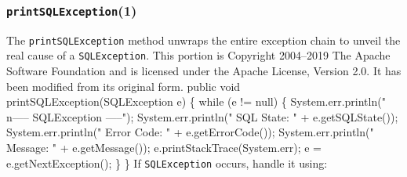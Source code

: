 \documentclass{article}
\def\nwendcode{\endtrivlist \endgroup}
\theoremstyle{definition}
\begin{document}
\subsubsection{{\tt{}\protect{}printSQLException}(1)}
The {\tt{}\protect{}printSQLException} method  unwraps the entire exception chain to unveil
the real cause of a {\tt{}SQLException}.  This portion is Copyright 2004--2019 The
Apache Software Foundation and is licensed under the Apache License, Version
2.0. It has been modified from its original form.
\nwenddocs{}\endmoddef{}
public void printSQLException(SQLException e) \{
  while (e != null) \{
    System.err.println("\\n----- SQLException -----");
    System.err.println("  SQL State:  " + e.getSQLState());
    System.err.println("  Error Code: " + e.getErrorCode());
    System.err.println("  Message:    " + e.getMessage());
    e.printStackTrace(System.err);
    e = e.getNextException();
  \}
\}
\eatline
{}\nwendcode{}If {\tt{}SQLException} occurs, handle it using:
\end{document}
